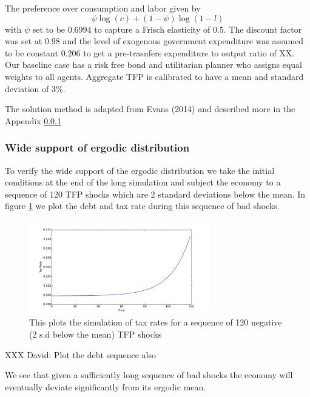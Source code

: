 \documentclass[11.5pt,twoside]{article}
\begin{document}
The preference over consumption and labor given by
\[
	\psi \log(c) + (1-\psi) \log(1-l)
\]with $\psi$ set to be $0.6994$ to capture a Frisch elasticity of 0.5.  The discount factor was set at $0.98$ and the level of exogenous government expenditure was assumed to be constant $0.206$ to get a pre-trasnfers expenditure to output ratio of XX. Our baseline case has a risk free bond and utilitarian planner who assigns equal weights to all agents.  Aggregate TFP is calibrated to have a mean and standard deviation of 3\%.

The solution method is adapted from Evans (2014) and described more in the Appendix \ref{}
  
\subsubsection{Wide support of ergodic distribution}

To verify the wide support of the ergodic distribution we take the initial conditions at the end of the long simulation and subject the economy to a sequence of 120 TFP shocks which are 2 standard deviations below the mean.  In figure \ref{fig: wide support of taxes} we plot the debt and tax rate during this sequence of bad shocks.
 \begin{figure}[htp]
 \label{fig: wide support of taxes}
 	\centering
 	\includegraphics[width=0.7\textwidth]{plots/badshock.pdf}
 	\caption{This plots the simulation of tax rates for a sequence of 120 negative (2 s.d below the mean) TFP shocks}
 \end{figure}  

 
 
XXX David: Plot the debt sequence also




We see that given a sufficiently long sequence of bad shocks the economy will eventually deviate significantly from its ergodic mean.
\end{document}
